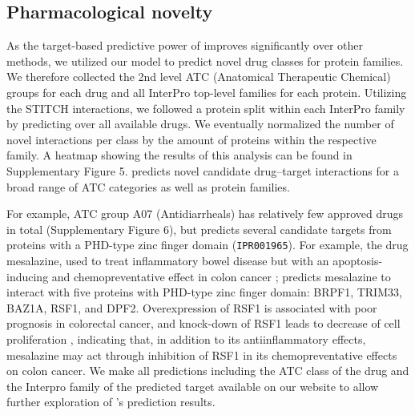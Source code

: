 \documentclass{bioinfo}
\renewcommand{\cite}{\citep}
\begin{document}
\subsection{Pharmacological novelty}

As the target-based predictive power of \name{} improves significantly
over other methods, we utilized our model to predict novel drug
classes for protein families. We therefore collected the 2nd level ATC
(Anatomical Therapeutic Chemical) groups for each drug and all
InterPro \cite{Interpro2020} top-level families for each
protein. Utilizing the STITCH interactions, we followed a protein
split within each InterPro family by predicting over all available
drugs. We eventually normalized the number of novel interactions per
class by the amount of proteins within the respective family. A
heatmap showing the results of this analysis can be found in
Supplementary Figure 5. \name{} predicts novel candidate drug--target
interactions for a broad range of ATC categories as well as protein
families.

For example, ATC group A07 (Antidiarrheals) has relatively few
approved drugs in total (Supplementary Figure 6), but \name{} predicts
several candidate targets from proteins with a PHD-type zinc finger
domain ({\tt IPR001965}). For example, the drug mesalazine, used to
treat inflammatory bowel disease but with an apoptosis-inducing and
chemopreventative effect in colon cancer \cite{Bus1999, Ishikawa2021};
\name{} predicts mesalazine to interact with five proteins with
PHD-type zinc finger domain: BRPF1, TRIM33, BAZ1A, RSF1, and
DPF2. Overexpression of RSF1 is associated with poor prognosis in
colorectal cancer, and knock-down of RSF1 leads to decrease of cell
proliferation \cite{Liu2012}, indicating that, in addition to its
antiinflammatory effects, mesalazine may act through inhibition of
RSF1 in its chemopreventative effects on colon cancer. We make all
predictions including the ATC class of the drug and the Interpro
family of the predicted target available on our website to allow
further exploration of \name{}'s prediction results.


\end{document}
